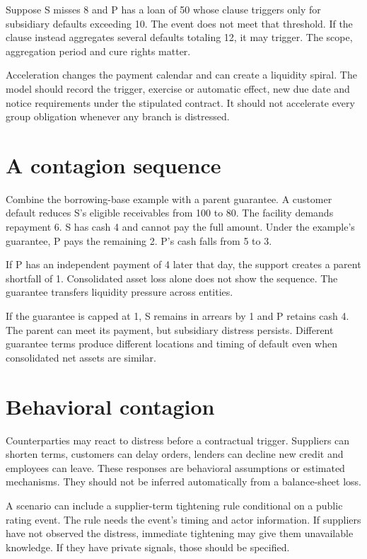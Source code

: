 Suppose S misses 8 and P has a loan of 50 whose clause triggers only for subsidiary defaults exceeding 10. The event does not meet that threshold. If the clause instead aggregates several defaults totaling 12, it may trigger. The scope, aggregation period and cure rights matter.

Acceleration changes the payment calendar and can create a liquidity spiral. The model should record the trigger, exercise or automatic effect, new due date and notice requirements under the stipulated contract. It should not accelerate every group obligation whenever any branch is distressed.

\section{A contagion sequence}
Combine the borrowing-base example with a parent guarantee. A customer default reduces S's eligible receivables from 100 to 80. The facility demands repayment 6. S has cash 4 and cannot pay the full amount. Under the example's guarantee, P pays the remaining 2. P's cash falls from 5 to 3.

If P has an independent payment of 4 later that day, the support creates a parent shortfall of 1. Consolidated asset loss alone does not show the sequence. The guarantee transfers liquidity pressure across entities.

If the guarantee is capped at 1, S remains in arrears by 1 and P retains cash 4. The parent can meet its payment, but subsidiary distress persists. Different guarantee terms produce different locations and timing of default even when consolidated net assets are similar.

\section{Behavioral contagion}
Counterparties may react to distress before a contractual trigger. Suppliers can shorten terms, customers can delay orders, lenders can decline new credit and employees can leave. These responses are behavioral assumptions or estimated mechanisms. They should not be inferred automatically from a balance-sheet loss.

A scenario can include a supplier-term tightening rule conditional on a public rating event. The rule needs the event's timing and actor information. If suppliers have not observed the distress, immediate tightening may give them unavailable knowledge. If they have private signals, those should be specified.

